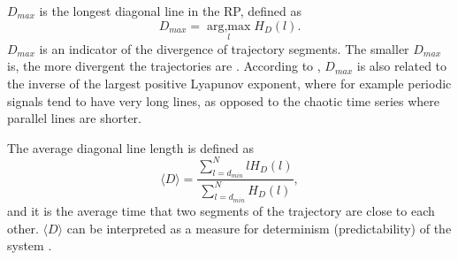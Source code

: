 $D_{max}$ is the longest diagonal line in the RP, defined as
\begin{equation}
D_{max}= \operatorname*{arg,\max}_{l} H_{D}(l).
\end{equation}
$D_{max}$ is an indicator of the divergence of trajectory segments.
The smaller $D_{max}$ is, the more divergent the trajectories are \cite{marwan2007, marwan2015}.
According to \cite{iwanski1998}, $D_{max}$ is also related to the inverse 
of the largest positive Lyapunov exponent, where
for example periodic signals tend to have very long lines,
as opposed to the chaotic time series where parallel lines are shorter.
  

The average diagonal line length is defined as
\begin{equation}  
\langle D \rangle = \frac{ \sum^{N}_{l=d_{min}} l H_D(l) }{ \sum^{N}_{l=d_{min}}  H_D(l)},
\end{equation}
and it is the average time that two segments of the trajectory are close to each other.
$\langle D \rangle$ can be interpreted as a measure for determinism (predictability) of the 
system \cite{marwan2007, marwan2015}.
%
  



